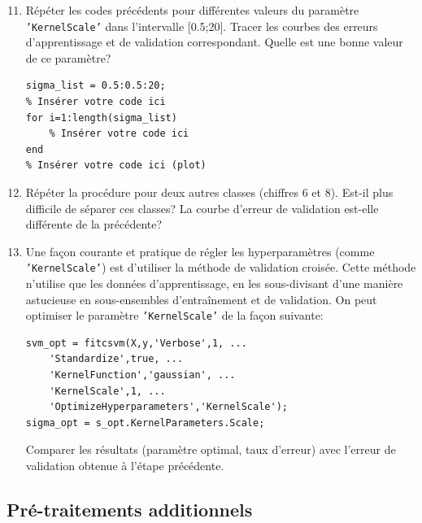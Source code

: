 \begin{enumerate}
\setcounter{enumi}{10}
	\item Répéter les codes précédents pour différentes valeurs du paramètre \texttt{'KernelScale'} dans l'intervalle [0.5;20]. Tracer les courbes des erreurs d'apprentissage et de validation correspondant. Quelle est une bonne valeur de ce paramètre?
\begin{lstlisting}
sigma_list = 0.5:0.5:20;
% Insérer votre code ici
for i=1:length(sigma_list)
    % Insérer votre code ici
end
% Insérer votre code ici (plot)
\end{lstlisting}

	\item Répéter la procédure pour deux autres classes (chiffres 6 et 8). Est-il plus difficile de séparer ces classes? La courbe d'erreur de validation est-elle différente de la précédente?

	\item  Une façon courante et pratique de régler les hyperparamètres (comme \texttt{'KernelScale'}) est d'utiliser la méthode de validation croisée. Cette méthode n'utilise que les données d'apprentissage, en les sous-divisant d'une manière astucieuse en sous-ensembles d'entraînement et de validation. On peut optimiser le paramètre \texttt{'KernelScale'} de la façon suivante:
\begin{lstlisting}
svm_opt = fitcsvm(X,y,'Verbose',1, ...
	'Standardize',true, ...
	'KernelFunction','gaussian', ...
	'KernelScale',1, ...
	'OptimizeHyperparameters','KernelScale');
sigma_opt = s_opt.KernelParameters.Scale;
\end{lstlisting}

	Comparer les résultats (paramètre optimal, taux d'erreur) avec l'erreur de validation obtenue à l'étape précédente.
	
	\end{enumerate}
	
	\subsection{Pré-traitements additionnels}
	
